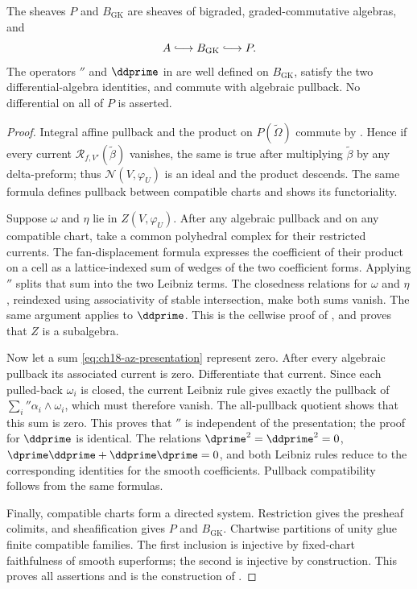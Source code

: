 \begin{proposition}
\label{prop:ch18-global-pb-structure}
The sheaves $P$ and $B_{\mathrm{GK}}$ are sheaves of bigraded,
graded-commutative algebras, and
\[
                         A\lhook\joinrel\longrightarrow
                         B_{\mathrm{GK}}\lhook\joinrel\longrightarrow P.
\]
The operators $\dprime$ and $\ddprime$ in
 are well defined on $B_{\mathrm{GK}}$, satisfy the
two differential-algebra identities, and commute with algebraic pullback.
No differential on all of $P$ is asserted.
\end{proposition}

\begin{proof}
Integral affine pullback and the product on $P(\widetilde\Omega)$ commute by
.  Hence if every current
$\mathcal R_{f,V'}(\widetilde\beta)$ vanishes, the same is true after
multiplying $\widetilde\beta$ by any delta-preform; thus
$\mathcal N(V,\varphi_U)$ is an ideal and the product descends.  The same
formula defines pullback between compatible charts and shows its
functoriality.

Suppose $\omega$ and $\eta$ lie in $Z(V,\varphi_U)$.  After any algebraic
pullback and on any compatible chart, take a common polyhedral complex for
their restricted currents.  The fan-displacement formula expresses the
coefficient of their product on a cell as a lattice-indexed sum of wedges of
the two coefficient forms.  Applying $\dprime$ splits that sum into the two
Leibniz terms.  The closedness relations for $\omega$ and $\eta$, reindexed
using associativity of stable intersection, make both sums vanish.  The
same argument applies to $\ddprime$.  This is the cellwise proof of
\cite[Lemma~3.7 and Proposition~4.7]{GK17}, and proves that $Z$ is a
subalgebra.

Now let a sum \eqref{eq:ch18-az-presentation} represent zero.  After every
algebraic pullback its associated current is zero.  Differentiate that
current.  Since each pulled-back $\omega_i$ is closed, the current Leibniz
rule gives exactly the pullback of
$\sum_i\dprime\alpha_i\wedge\omega_i$, which must therefore vanish.  The
all-pullback quotient shows that this sum is zero.  This proves that
$\dprime$ is independent of the presentation; the proof for $\ddprime$ is
identical.  The relations $\dprime^2=\ddprime^2=0$,
$\dprime\ddprime+\ddprime\dprime=0$, and both Leibniz rules reduce to the
corresponding identities for the smooth coefficients.  Pullback
compatibility follows from the same formulas.

Finally, compatible charts form a directed system.  Restriction gives the
presheaf colimits, and sheafification gives $P$ and $B_{\mathrm{GK}}$.
Chartwise partitions of unity glue finite compatible families.  The first
inclusion is injective by fixed-chart faithfulness of smooth superforms; the
second is injective by construction.  This proves all assertions and is
the construction of \cite[Definitions~4.9, 4.13 and
Proposition~4.15]{GK17}.
\end{proof}

